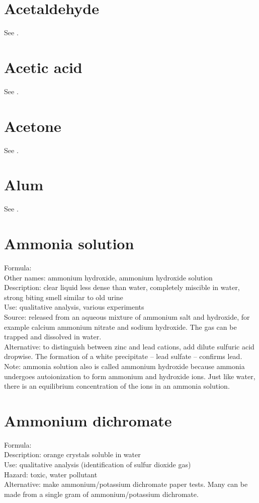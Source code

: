 \section{Acetaldehyde}
\label{sec:}
See .

\section{Acetic acid}
\label{sec:}
See .

\section{Acetone}
\label{sec:}
See .

\section{Alum}
\label{sec:}
See .

\section{Ammonia solution}
\label{sec:ammoniasol}
Formula: \\
Other names: ammonium hydroxide, 
ammonium hydroxide solution\\
Description: clear liquid less dense than water, 
completely miscible in water, 
strong biting smell similar to old urine\\
Use: qualitative analysis, various experiments\\
Source: released from an aqueous mixture of ammonium salt and hydroxide, 
for example calcium ammonium nitrate and sodium hydroxide. 
The gas can be trapped and dissolved in water.\\
Alternative: to distinguish between zinc and lead cations, 
add dilute sulfuric acid dropwise. 
The formation of a white precipitate -- lead sulfate -- confirms lead.
Note: ammonia solution also is called ammonium hydroxide 
because ammonia undergoes autoionization to form ammonium and hydroxide ions. 
Just like water, 
there is an equilibrium concentration of the ions in an ammonia solution.

\section{Ammonium dichromate}
\label{sec:}
Formula: \\
Description: orange crystals soluble in water\\
Use: qualitative analysis (identification of sulfur dioxide gas)\\
Hazard: toxic, 
water pollutant\\
Alternative: make ammonium/potassium dichromate paper tests. 
Many can be made from a single gram of ammonium/potassium dichromate.

